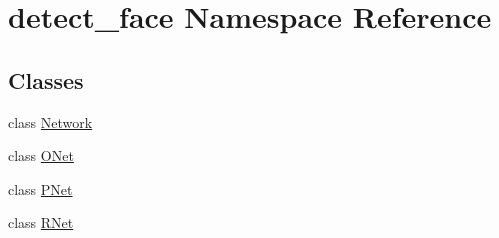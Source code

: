 \hypertarget{namespacedetect__face}{}\section{detect\+\_\+face Namespace Reference}
\label{namespacedetect__face}
\subsection*{Classes}
\begin{DoxyCompactItemize}
\item 
class \hyperlink{classdetect__face_1_1Network}{Network}
\item 
class \hyperlink{classdetect__face_1_1ONet}{O\+Net}
\item 
class \hyperlink{classdetect__face_1_1PNet}{P\+Net}
\item 
class \hyperlink{classdetect__face_1_1RNet}{R\+Net}
\end{DoxyCompactItemize}
